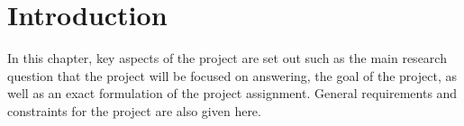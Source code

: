 \section{Introduction}
In this chapter, key aspects of the project are set out such as the main research question that the project will be focused on answering, the goal of the project, as well as an exact formulation of the project assignment. General requirements and constraints for the project are also given here.
